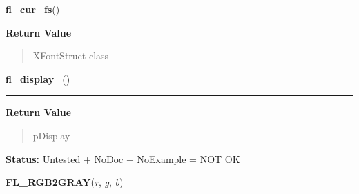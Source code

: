     \vspace{0.5ex}

\hspace{.8\funcindent}\begin{boxedminipage}{\funcwidth}

    \raggedright \textbf{fl\_cur\_fs}()

\setlength{\parskip}{2ex}
\setlength{\parskip}{1ex}
      \textbf{Return Value}
    \vspace{-1ex}

      \begin{quote}
      XFontStruct class

      \end{quote}

    \end{boxedminipage}

    \label{xformslib:library:fl_display_}

    \vspace{0.5ex}

\hspace{.8\funcindent}\begin{boxedminipage}{\funcwidth}

    \raggedright \textbf{fl\_display\_}()

    \vspace{-1.5ex}

    \rule{\textwidth}{0.5\fboxrule}
\setlength{\parskip}{2ex}
\setlength{\parskip}{1ex}
      \textbf{Return Value}
    \vspace{-1ex}

      \begin{quote}
      pDisplay

      \end{quote}

\textbf{Status:} Untested + NoDoc + NoExample = NOT OK



    \end{boxedminipage}

    \label{xformslib:library:FL_RGB2GRAY}

    \vspace{0.5ex}

\hspace{.8\funcindent}\begin{boxedminipage}{\funcwidth}

    \raggedright \textbf{FL\_RGB2GRAY}(\textit{r}, \textit{g}, \textit{b})

\setlength{\parskip}{2ex}
\setlength{\parskip}{1ex}
    \end{boxedminipage}

